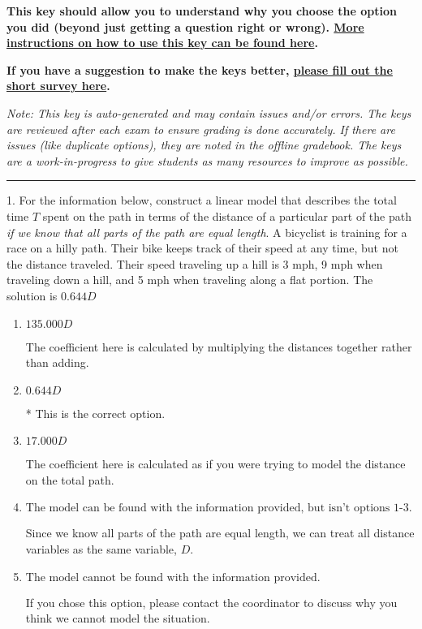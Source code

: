 \documentclass{extbook}[14pt]
\begin{document}
\textbf{This key should allow you to understand why you choose the option you did (beyond just getting a question right or wrong). \href{https://xronos.clas.ufl.edu/mac1105spring2020/courseDescriptionAndMisc/Exams/LearningFromResults}{More instructions on how to use this key can be found here}.}

\textbf{If you have a suggestion to make the keys better, \href{https://forms.gle/CZkbZmPbC9XALEE88}{please fill out the short survey here}.}

\textit{Note: This key is auto-generated and may contain issues and/or errors. The keys are reviewed after each exam to ensure grading is done accurately. If there are issues (like duplicate options), they are noted in the offline gradebook. The keys are a work-in-progress to give students as many resources to improve as possible.}

\rule{\textwidth}{0.4pt}

1. For the information below, construct a linear model that describes the total time $T$ spent on the path in terms of the distance of a particular part of the path \textit{if we know that all parts of the path are equal length}.
A bicyclist is training for a race on a hilly path. Their bike keeps track of their speed at any time, but not the distance traveled. Their speed traveling up a hill is 3 mph, 9 mph when traveling down a hill, and 5 mph when traveling along a flat portion. 
The solution is $ 0.644 D $ 

\begin{enumerate}[label=\Alph*.] 
\item $ 135.000 D $ 

 The coefficient here is calculated by multiplying the distances together rather than adding. 
\item $ 0.644 D $ 

 * This is the correct option. 
\item $ 17.000 D $ 

 The coefficient here is calculated as if you were trying to model the distance on the total path. 
\item $ \text{The model can be found with the information provided, but isn't options 1-3.} $ 

 Since we know all parts of the path are equal length, we can treat all distance variables as the same variable, $D$. 
\item $ \text{The model cannot be found with the information provided.} $ 

 If you chose this option, please contact the coordinator to discuss why you think we cannot model the situation. 
\end{enumerate} 
 
\end{document}
